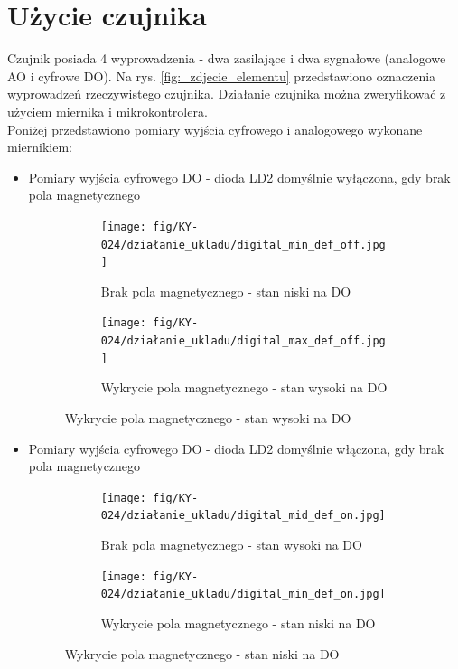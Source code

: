 \documentclass[11pt, a4paper]{article}
\begin{document}
\section{Użycie czujnika}
Czujnik posiada 4 wyprowadzenia - dwa zasilające i dwa sygnałowe (analogowe AO i cyfrowe DO). Na rys. \ref{fig:_zdjecie_elementu} przedstawiono oznaczenia wyprowadzeń rzeczywistego czujnika. Działanie czujnika można zweryfikować z użyciem miernika i mikrokontrolera.
\\
Poniżej przedstawiono pomiary wyjścia cyfrowego i analogowego wykonane miernikiem:
\begin{itemize}
\item{Pomiary wyjścia cyfrowego DO - dioda LD2 domyślnie wyłączona, gdy brak pola magnetycznego}
\begin{figure}[h]
\centering
\begin{subfigure}{.5\textwidth}
\centering
\texttt{[image: fig/KY-024/działanie\_ukladu/digital\_min\_def\_off.jpg]}
\caption{Brak pola magnetycznego - stan niski na DO}
\label{fig:_digital_min_def_off}
\end{subfigure}%
\begin{subfigure}{.5\textwidth}
\centering
\texttt{[image: fig/KY-024/działanie\_ukladu/digital\_max\_def\_off.jpg]}
\caption{Wykrycie pola magnetycznego - stan wysoki na DO}
\label{fig:_digital_max_def_off}
\end{subfigure}
\label{fig:mikroproc}
\end{figure}

\item{Pomiary wyjścia cyfrowego DO - dioda LD2 domyślnie włączona, gdy brak pola magnetycznego}
\begin{figure}[h]
\centering
\begin{subfigure}{.5\textwidth}
\centering
\texttt{[image: fig/KY-024/działanie\_ukladu/digital\_mid\_def\_on.jpg]}
\caption{Brak pola magnetycznego - stan wysoki na DO}
\label{fig:_digital_mid_def_on}
\end{subfigure}%
\begin{subfigure}{.5\textwidth}
\centering
\texttt{[image: fig/KY-024/działanie\_ukladu/digital\_min\_def\_on.jpg]}
\caption{Wykrycie pola magnetycznego - stan niski na DO}
\label{fig:_digital_min_def_on}
\end{subfigure}
\label{fig:miernik2}
\end{figure}


\end{itemize}
\end{document}
